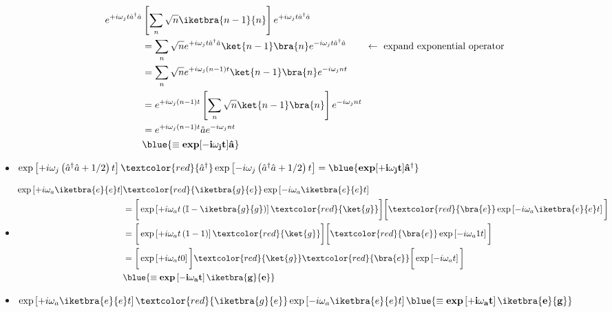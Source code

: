 \begin{itemize}
  \begin{equation}
    \begin{aligned}
      e^{+i\omega_jt\hat{a}^\dagger\hat a} & \left[\sum_n\sqrt{n}\iketbra{n-1}{n}\right]e^{+i\omega_jt\hat{a}^\dagger\hat a}\\
      & = \sum_n \sqrt{n}e^{+i\omega_jt\hat{a}^\dagger\hat a}\ket{n-1}\bra{n}e^{-i\omega_jt\hat{a}^\dagger\hat a} \qquad \leftarrow\text{ expand exponential operator}\\
      & = \sum_n \sqrt{n}e^{+i\omega_j(n-1)t}\ket{n-1}\bra{n}e^{-i\omega_jnt}\\
      & = e^{+i\omega_j(n-1)t}\left[\sum_n \sqrt{n}\ket{n-1}\bra{n}\right]e^{-i\omega_jnt}\\
      &      =      e^{+i\omega_j(n-1)t}\hat{a}e^{-i\omega_jnt}\\      &
      \blue{\mathbf{\equiv \text{\textbf{exp}}[-i\omega_jt]\hat{a}}}
    \end{aligned}
  \end{equation}

\item
  $\exp\left[+i\omega_j\left(\hat{a}^\dagger\hat{a}+{1}/{2}\right)t\right]\textcolor{red}{\hat{a}^\dagger}\exp\left[-i\omega_j\left(\hat{a}^\dagger\hat{a}+{1}/{2}\right)t\right]
  = \blue{\mathbf{\text{\textbf{exp}}[+i\omega_jt]\hat{a}^\dagger}}$

\item \begin{equation}
    \begin{aligned}
      \exp\left[+i\omega_a\iketbra{e}{e}t\right]&\textcolor{red}{\iketbra{g}{e}}\exp\left[-i\omega_a\iketbra{e}{e}t\right] \\
      & = \bigg[\exp\left[+i\omega_at\left(\mathbb{I} - \iketbra{g}{g}\right)\right]\textcolor{red}{\ket{g}}\bigg]\bigg[\textcolor{red}{\bra{e}}\exp\left[-i\omega_a\iketbra{e}{e}t\right]\bigg]\\
      & = \bigg[\exp\left[+i\omega_at\left(1 - 1\right)\right]\textcolor{red}{\ket{g}}\bigg]\bigg[\textcolor{red}{\bra{e}}\exp\left[-i\omega_a1t\right]\bigg]\\
      & = \bigg[\exp\left[+i\omega_at0\right]\bigg]\textcolor{red}{\ket{g}}\textcolor{red}{\bra{e}}\bigg[\exp\left[-i\omega_at\right]\bigg]\\
      &                                             \blue{\mathbf{\equiv
          \text{\textbf{exp}}\left[-i\omega_at\right]\iketbra{g}{e}}}
    \end{aligned}
  \end{equation}
\item
  $\exp\left[+i\omega_a\iketbra{e}{e}t\right]\textcolor{red}{\iketbra{g}{e}}\exp\left[-i\omega_a\iketbra{e}{e}t\right]
  \blue{\mathbf{\equiv
      \text{\textbf{exp}}\left[+i\omega_at\right]\iketbra{e}{g}}} $
\end{itemize}

